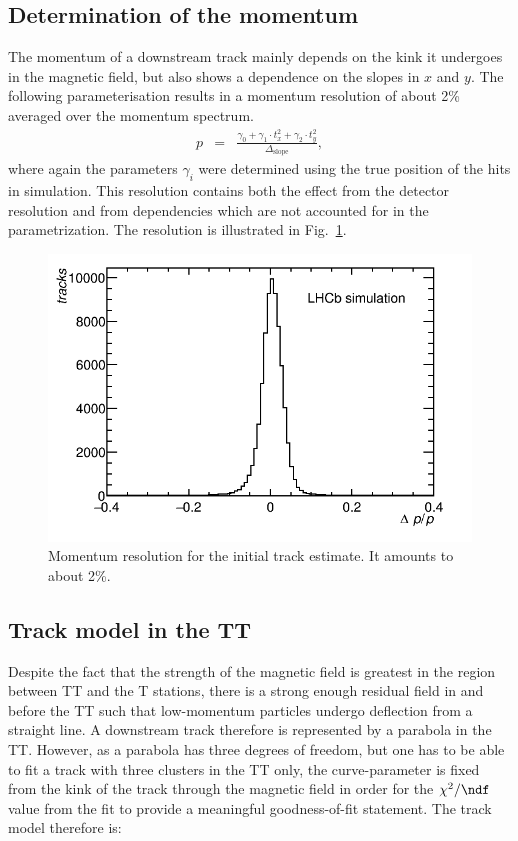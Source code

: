 \subsection{Determination of the momentum}
The momentum of a downstream track mainly depends on the kink it undergoes in
the magnetic field, but also shows a dependence on the slopes in $x$ and $y$.
The following parameterisation results in a momentum resolution of about 2\%
averaged over the momentum spectrum.
\begin{eqnarray}
\label{eq:momentum}
p & = & \frac{ \gamma_{0} + \gamma_{1} \cdot t_{x}^{2} + \gamma_{2} \cdot t_{y}^{2} }{ \Delta_{\text{slope}} },
\end{eqnarray}
where again the parameters $\gamma_{i}$ were determined using the true position
of the hits in simulation. This resolution contains both the effect from the detector 
resolution and from dependencies which are not accounted for in the parametrization. 
The resolution is illustrated in Fig.~\ref{fig:momReso}.
\begin{figure}[!htbp]
 \begin{center}
   \includegraphics[width=0.8\linewidth]{figures/momReso.png}
    \caption{Momentum resolution for the initial track estimate. It amounts to about 2\%.
     \label{fig:momReso}}
 \end{center}
\end{figure}


\subsection{Track model in the TT}
\label{sec:trackModelTT}
Despite the fact that the strength of the magnetic field is greatest in the region between TT and the T stations,
there is a strong enough residual field in and before the TT such that low-momentum particles undergo deflection from a
straight line. A downstream track therefore is represented by a
parabola in the TT. However, as a parabola has three degrees of freedom, but one
has to be able to fit a track with three clusters in the TT only, the
curve-parameter is fixed from the kink of the track through the magnetic field in order for the $\chi^2/\ndf$ value from the fit to provide a meaningful goodness-of-fit statement.
The track model therefore is:

